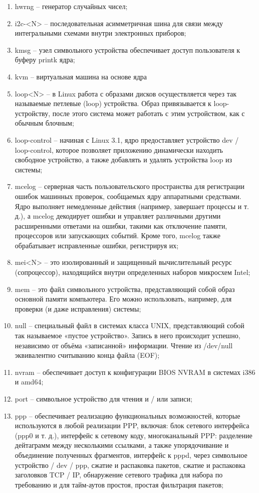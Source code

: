 \begin{enumerate}
    \item hwrng -- генератор случайных чисел;
    \item i2c-<N> -- последовательная асимметричная шина для связи между интегральными схемами внутри электронных приборов;
    \item kmsg -- узел символьного устройства обеспечивает доступ пользователя к буферу printk ядра;
    \item kvm -- виртуальная машина на основе ядра
    \item loop<N> -- в Linux работа с образами дисков осуществляется через так называемые петлевые (loop) устройства. Образ привязывается к loop-устройству, после этого система может работать с этим устройством, как с обычным блочным;
    \item loop-control -- начиная с Linux 3.1, ядро предоставляет устройство dev / loop-control, которое позволяет приложению динамически находить свободное устройство, а также добавлять и удалять устройства loop из системы;
    \item mcelog -- серверная часть пользовательского пространства для регистрации ошибок машинных проверок, сообщаемых ядру аппаратными средствами. Ядро выполняет немедленные действия (например, завершает процессы и т. д.), а mcelog декодирует ошибки и управляет различными другими расширенными ответами на ошибки, такими как отключение памяти, процессоров или запускающих событий. Кроме того, mcelog также обрабатывает исправленные ошибки, регистрируя их;
    \item mei<N> -- это изолированный и защищенный вычислительный ресурс (сопроцессор), находящийся внутри определенных наборов микросхем Intel;
    \item mem -- это файл символьного устройства, представляющий собой образ основной памяти компьютера. Его можно использовать, например, для проверки (и даже исправления) системы;
    \item null -- специальный файл в системах класса UNIX, представляющий собой так называемое «пустое устройство». Запись в него происходит успешно, независимо от объёма «записанной» информации. Чтение из /dev/null эквивалентно считыванию конца файла (EOF);
    \item nvram -- обеспечивает доступ к конфигурации BIOS NVRAM в системах i386 и amd64;
    \item port -- символьное устройство для чтения и / или записи;
    \item ppp -- обеспечивает реализацию функциональных возможностей, которые используются в любой реализации PPP, включая: блок сетевого интерфейса (ppp0 и т. д.), интерфейс к сетевому коду, многоканальный PPP: разделение дейтаграмм между несколькими ссылками, а также упорядочивание и объединение полученных фрагментов, интерфейс к pppd, через символьное устройство / dev / ppp, сжатие и распаковка пакетов, сжатие и распаковка заголовков TCP / IP, обнаружение сетевого трафика для набора по требованию и для тайм-аутов простоя, простая фильтрация пакетов;

\end{enumerate}
